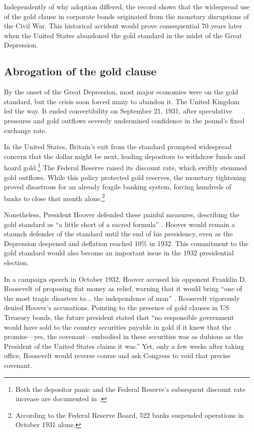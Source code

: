 Independently of why adoption differed, the record shows that the widespread use of the gold clause in corporate bonds originated from the monetary disruptions of the Civil War. This historical accident would prove consequential 70 years later when the United States abandoned the gold standard in the midst of the Great Depression.

\subsection{Abrogation of the gold clause}
\label{sec:abrogation_of_gold_clauses}

\noindent By the onset of the Great Depression, most major economies were on the gold standard, but the crisis soon forced many to abandon it. The United Kingdom led the way. It ended convertibility on September 21, 1931, after speculative pressures and gold outflows severely undermined confidence in the pound's fixed exchange rate.

In the United States, Britain's exit from the standard prompted widespread concern that the dollar might be next, leading depositors to withdraw funds and hoard gold.\footnote{Both the depositor panic and the Federal Reserve's subsequent discount rate increase are documented in \cite{Friedman1963}.} The Federal Reserve raised its discount rate, which swiftly stemmed gold outflows. While this policy protected gold reserves, the monetary tightening proved disastrous for an already fragile banking system, forcing hundreds of banks to close that month alone.\footnote{According to the Federal Reserve Board, 522 banks suspended operations in October 1931 alone.}

Nonetheless, President Hoover defended these painful measures, describing the gold standard as ``a little short of a sacred formula'' \citep{Eichengreen2000}. Hoover would remain a staunch defender of the standard until the end of his presidency, even as the Depression deepened and deflation reached 10\% in 1932. This commitment to the gold standard would also become an important issue in the 1932 presidential election. 

In a campaign speech in October 1932, Hoover accused his opponent Franklin D. Roosevelt of proposing fiat money as relief, warning that it would bring ``one of the most tragic disasters to... the independence of man'' \citep{Edwards2018}. Roosevelt vigorously denied Hoover's accusations. Pointing to the presence of gold clauses in US Treasury bonds, the future president stated that ``no responsible government would have sold to the country securities payable in gold if it knew that the promise---yes, the covenant---embodied in these securities was as dubious as the President of the United States claims it was.'' Yet, only a few weeks after taking office, Roosevelt would reverse course and ask Congress to void that precise covenant.

